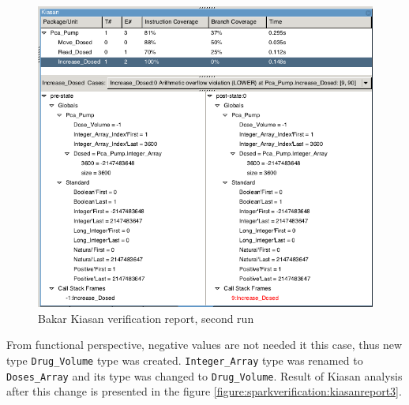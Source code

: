 \begin{figure}[ht]%
    \begin{center}
        \includegraphics[width=1.0\textwidth]{figures/pca-pump-verification-step2.png}
        \caption{Bakar Kiasan verification report, second run}
    \end{center}
    \label{figure:sparkverification:kiasanreport2}
\end{figure}

From functional perspective, negative values are not needed it this case, thus new type \lstinline{Drug_Volume} type was created. \lstinline{Integer_Array} type was renamed to \lstinline{Doses_Array} and its type was changed to \lstinline{Drug_Volume}. Result of Kiasan analysis after this change is presented in the figure \ref{figure:sparkverification:kiasanreport3}.

